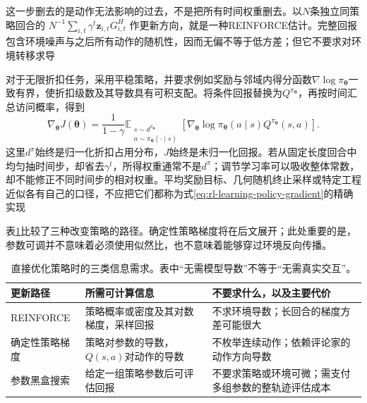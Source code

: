 这一步删去的是动作无法影响的过去，不是把所有时间权重删去。以$N$条独立同策略回合的
$N^{-1}\sum_{i,t}\gamma^t\bm{z}_{i,t}G_{i,t}^H$
作更新方向，就是一种REINFORCE估计。完整回报包含环境噪声与之后所有动作的随机性，因而无偏不等于低方差；但它不要求对环境转移求导

对于无限折扣任务，采用平稳策略，并要求例如奖励与邻域内得分函数$\nabla\log\pi_{\bm\theta}$一致有界，使折扣级数及其导数具有可积支配。将条件回报替换为$Q^{\pi_{\bm\theta}}$，再按时间汇总访问概率，得到
\begin{equation}
  \nabla_{\bm\theta}J(\bm\theta)
    =\frac{1}{1-\gamma}
      \mathbb E_{\substack{s\sim d^{\pi_{\bm\theta}}\\
                           a\sim\pi_{\bm\theta}(\cdot\mid s)}}
        \left[\nabla_{\bm\theta}\log\pi_{\bm\theta}(a\mid s)
              Q^{\pi_{\bm\theta}}(s,a)\right].
  \label{eq:rl-learning-policy-gradient}
\end{equation}
这里$d^\pi$始终是归一化折扣占用分布，$J$始终是未归一化回报。若从固定长度回合中均匀抽时间步，却省去$\gamma^t$，所得权重通常不是$d^\pi$；调节学习率可以吸收整体常数，却不能修正不同时间步的相对权重。平均奖励目标、几何随机终止采样或特定工程近似各有自己的口径，不应把它们都称为式\eqref{eq:rl-learning-policy-gradient}的精确实现

表\ref{tab:rl-learning-policy-search-information}比较了三种改变策略的路径。确定性策略梯度将在后文展开；此处重要的是，参数可调并不意味着必须使用似然比，也不意味着能够穿过环境反向传播。

\begin{table}[t]
  \centering
  \small
  \begin{tabularx}{\linewidth}{>{\raggedright\arraybackslash}p{29mm} >{\raggedright\arraybackslash}X >{\raggedright\arraybackslash}X}
    \toprule
    更新路径 & 所需可计算信息 & 不要求什么，以及主要代价 \\
    \midrule
    REINFORCE & 策略概率或密度及其对数梯度，采样回报 & 不求环境导数；长回合的梯度方差可能很大 \\
    确定性策略梯度 & 策略对参数的导数，$Q(s,a)$对动作的导数 & 不枚举连续动作；依赖评论家的动作方向导数 \\
    参数黑盒搜索 & 给定一组策略参数后可评估回报 & 不要求策略或环境可微；需支付多组参数的整轨迹评估成本 \\
    \bottomrule
  \end{tabularx}
  \caption{直接优化策略时的三类信息需求。表中“无需模型导数”不等于“无需真实交互”。}
  \label{tab:rl-learning-policy-search-information}
\end{table}

